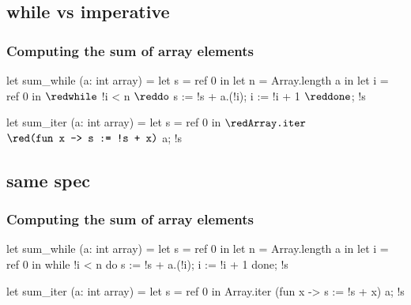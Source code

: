 \documentclass[xcolor=dvipsnames]{beamer}
\begin{document}
\subsection*{while vs imperative}
\begin{frame}[fragile]\frametitle{Computing the sum of array elements}
\begin{adjustwidth}{-0.3cm}{1.0cm}
\begin{small}
\begin{minipage}[t]{0.4\textwidth}
\begin{whycode}  
let sum_while (a: int array)
= let s = ref 0 in
  let n = Array.length a in
  let i = ref 0 in
  ${\red \texttt{while}}$ !i < n ${\red \texttt{do}}$
    s := !s + a.(!i);
    i := !i + 1
  ${\red \texttt{done}}$;
  !s
\end{whycode}
\end{minipage}\hfill
\begin{minipage}[t]{0.4\textwidth}
\begin{whycode} 
let sum_iter (a: int array)
= let s = ref 0 in
  ${\red \texttt{Array.iter}}$ 
    ${\red \texttt{(fun x -> s := !s + x)}}$ a;
  !s
\end{whycode}	
\end{minipage}
\end{small}
\end{adjustwidth}
\end{frame}
\addtocounter{framenumber}{-1}

\subsection*{same spec}
\begin{frame}[fragile]\frametitle{Computing the sum of array elements}
\begin{adjustwidth}{-1em}{2em}
\begin{small}
\begin{minipage}[t]{0.4\textwidth}
\begin{whycode}  
let sum_while (a: int array)
= let s = ref 0 in
  let n = Array.length a in
  let i = ref 0 in
  while !i < n do
    s := !s + a.(!i);
    i := !i + 1
  done;
  !s
\end{whycode}
\end{minipage}\hfill
\begin{minipage}[t]{0.4\textwidth}
\begin{whycode} 
let sum_iter (a: int array)
= let s = ref 0 in
  Array.iter 
    (fun x -> s := !s + x) a;
  !s
\end{whycode}	
\end{minipage}
\end{small}
\end{adjustwidth}
\end{frame}
\end{document}
